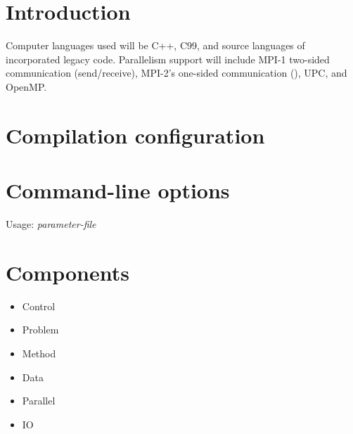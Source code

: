\documentclass{article}
\begin{document}

\tableofcontents
\section{Introduction} \label{s:intro}

Computer languages used will be C++, C99, and source languages of
incorporated legacy code.  Parallelism support will include MPI-1
two-sided communication (send/receive), MPI-2's one-sided
communication (), UPC, and OpenMP.

\section{Compilation configuration} \label{s:compile}

\section{Command-line options} \label{s:commandline}

Usage:  \textit{parameter-file}

\section{Components} \label{s:components}

\begin{itemize}
\item Control
\item Problem
\item Method
\item Data
\item Parallel
\item IO
\end{itemize}
\end{document}

